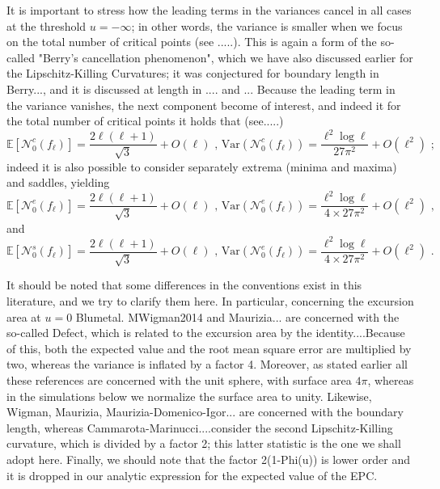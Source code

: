 \documentclass[aps,prd,showpacs,superscriptaddress,groupedaddress]{revtex4-1}  %
\begin{document}
It is important to stress how the leading terms in the variances cancel in all cases at the threshold $u=-\infty$; in other words, the variance is smaller when we focus on the total number of critical points (see .....). This is again a form of the so-called "Berry's cancellation phenomenon", which we have also discussed earlier for the Lipschitz-Killing Curvatures; it was conjectured for boundary length in Berry..., and it is discussed at length in .... and ... Because the leading term in the variance vanishes, the next component become of interest, and indeed it for the total number of critical points it holds that  (see.....)
\begin{equation*}
\mathbb{E}[\mathcal{N}_{0}^{c}(f_{\ell })]=\frac{2\ell(\ell+1)}{\sqrt{3}}+O(\ell) \text{ , } {\text{Var}}(\mathcal{N}_{0}^{c}(f_{\ell }))=\frac{\ell^2 \log \ell}{27 \pi^2} + O(\ell^2)\text{ ;}    
\end{equation*}
indeed it is also possible to consider separately extrema (minima and maxima) and saddles, yielding
\begin{equation*}
\mathbb{E}[\mathcal{N}_{0}^{e}(f_{\ell })]=\frac{2\ell(\ell+1)}{\sqrt{3}}+O(\ell) \text{ , }{\text{Var}}(\mathcal{N}_{0}^{e}(f_{\ell }))=\frac{\ell^2 \log \ell}{4 \times 27 \pi^2} + O(\ell^2)\text{ ,}   
\end{equation*}
and
\begin{equation*}
\mathbb{E}[\mathcal{N}_{0}^{s}(f_{\ell })]=\frac{2\ell(\ell+1)}{\sqrt{3}}+ O(\ell) \text{ , }{\text{Var}}(\mathcal{N}_{0}^{e}(f_{\ell }))=\frac{\ell^2 \log \ell}{4 \times 27 \pi^2}+ O(\ell^2) \text{ .}   
\end{equation*}

\begin{remark} It should be noted that some differences in the conventions exist in this literature, and we try to clarify them here. In particular, concerning the excursion area at $u=0$ Blumetal. MWigman2014 and Maurizia... are concerned with the so-called Defect, which is related to the excursion area by the identity....Because of this, both the expected value and the root mean square error are multiplied by two, whereas the variance is inflated by a factor 4. Moreover, as stated earlier all these references are concerned with the unit sphere, with surface area $4\pi$, whereas in the simulations below we normalize the surface area to unity. Likewise, Wigman, Maurizia, Maurizia-Domenico-Igor... are concerned with the boundary length, whereas Cammarota-Marinucci....consider the second Lipschitz-Killing curvature, which is divided by a factor 2; this latter statistic is the one we shall adopt here. Finally, we should note that the factor 2(1-Phi(u)) is lower order and it is dropped in our analytic expression for the expected value of the EPC.
\end{remark}
\end{document}
